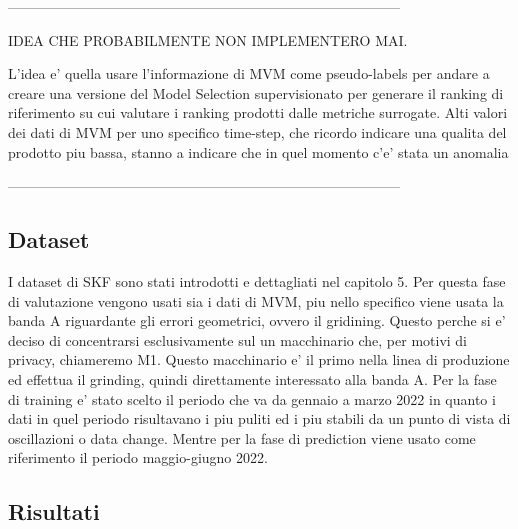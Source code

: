 ------------------------------------------------------------------------------------

IDEA CHE PROBABILMENTE NON IMPLEMENTERO MAI.

L'idea e' quella usare l'informazione di MVM come pseudo-labels per andare a creare una versione del Model Selection supervisionato per generare il ranking di riferimento su cui valutare i ranking prodotti dalle metriche surrogate. Alti valori dei dati di MVM per uno specifico time-step, che ricordo indicare una qualita del prodotto piu bassa, stanno a indicare che in quel momento c'e' stata un anomalia

------------------------------------------------------------------------------------

\subsection{Dataset}
I dataset di SKF sono stati introdotti e dettagliati nel capitolo 5. Per questa fase di valutazione vengono usati sia i dati di MVM, piu nello specifico viene usata la banda A riguardante gli errori geometrici, ovvero il gridining. Questo perche si e' deciso di concentrarsi esclusivamente sul un macchinario che, per motivi di privacy, chiameremo M1. Questo macchinario e' il primo nella linea di produzione ed effettua il grinding, quindi direttamente interessato alla banda A.
Per la fase di training e' stato scelto il periodo che va da gennaio a marzo 2022 in quanto i dati in quel periodo risultavano i piu puliti ed i piu stabili da un punto di vista di oscillazioni o data change. Mentre per la fase di prediction viene usato come riferimento il periodo maggio-giugno 2022.
\subsection{Risultati}



